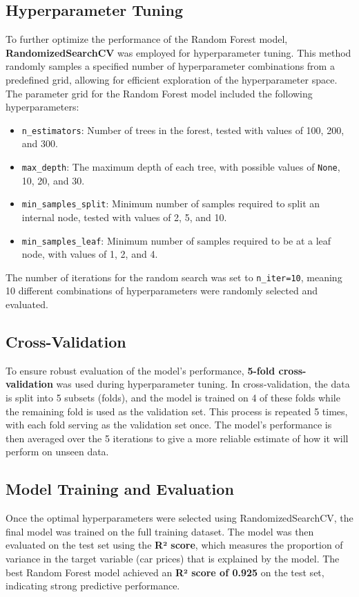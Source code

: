 \documentclass[a4paper,12pt]{article}
\begin{document}
\begin{justify}
\subsection{Hyperparameter Tuning}
To further optimize the performance of the Random Forest model, \textbf{RandomizedSearchCV} was employed for hyperparameter tuning. This method randomly samples a specified number of hyperparameter combinations from a predefined grid, allowing for efficient exploration of the hyperparameter space. The parameter grid for the Random Forest model included the following hyperparameters:
\begin{itemize}
    \item \texttt{n\_estimators}: Number of trees in the forest, tested with values of 100, 200, and 300.
    \item \texttt{max\_depth}: The maximum depth of each tree, with possible values of \texttt{None}, 10, 20, and 30.
    \item \texttt{min\_samples\_split}: Minimum number of samples required to split an internal node, tested with values of 2, 5, and 10.
    \item \texttt{min\_samples\_leaf}: Minimum number of samples required to be at a leaf node, with values of 1, 2, and 4.
\end{itemize}
The number of iterations for the random search was set to \texttt{n\_iter=10}, meaning 10 different combinations of hyperparameters were randomly selected and evaluated.

\subsection{Cross-Validation}
To ensure robust evaluation of the model's performance, \textbf{5-fold cross-validation} was used during hyperparameter tuning. In cross-validation, the data is split into 5 subsets (folds), and the model is trained on 4 of these folds while the remaining fold is used as the validation set. This process is repeated 5 times, with each fold serving as the validation set once. The model's performance is then averaged over the 5 iterations to give a more reliable estimate of how it will perform on unseen data.

\subsection{Model Training and Evaluation}
Once the optimal hyperparameters were selected using RandomizedSearchCV, the final model was trained on the full training dataset. The model was then evaluated on the test set using the \textbf{R² score}, which measures the proportion of variance in the target variable (car prices) that is explained by the model. The best Random Forest model achieved an \textbf{R² score of 0.925} on the test set, indicating strong predictive performance.


\end{justify}
\end{document}
